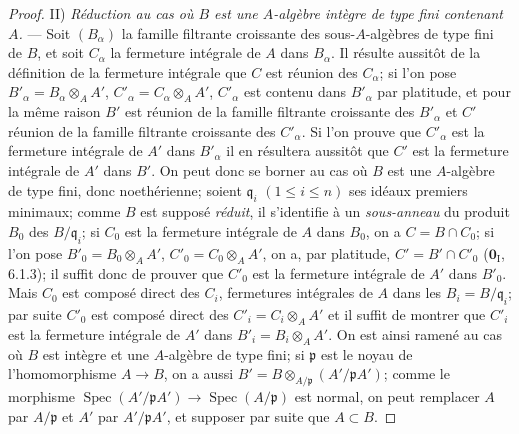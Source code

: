 \begin{proof}
II) \emph{Réduction au cas où $B$ est une $A$-algèbre intègre de type fini
contenant $A$.} --- Soit $(B_\alpha)$ la famille filtrante croissante des
sous-$A$-algèbres de type fini de $B$, et soit $C_\alpha$ la fermeture
intégrale de $A$ dans $B_\alpha$. Il résulte aussitôt de la définition de
la fermeture intégrale que $C$ est réunion des $C_\alpha$; si l'on pose
$B'_\alpha=B_\alpha\otimes_A A'$, $C'_\alpha=C_\alpha\otimes_A A'$,
$C'_\alpha$ est contenu dans $B'_\alpha$ par platitude, et pour la même
raison $B'$ est réunion de la famille filtrante croissante des
$B'_\alpha$ et $C'$ réunion de la famille filtrante croissante des
$C'_\alpha$. Si l'on prouve que $C'_\alpha$ est la fermeture intégrale de
$A'$ dans $B'_\alpha$ il en résultera aussitôt que $C'$ est la fermeture
intégrale de $A'$ dans $B'$. On peut donc se borner au cas où $B$ est une
$A$-algèbre de type fini, donc noethérienne; soient $\mathfrak q_i$
$(1\leqslant i\leqslant n)$ ses idéaux premiers minimaux; comme $B$ est
supposé \emph{réduit}, il s'identifie à un \emph{sous-anneau} du produit $B_0$ des
$B/\mathfrak q_i$; si $C_0$ est la fermeture intégrale de $A$ dans $B_0$,
on a $C=B\cap C_0$; si l'on pose $B'_0=B_0\otimes_A A'$,
$C'_0=C_0\otimes_A A'$, on a, par platitude,
$C'=B'\cap C'_0$ ($\mathbf{0}_{\mathrm I}$, 6.1.3); il suffit donc de prouver que
$C'_0$ est la fermeture intégrale de $A'$ dans $B'_0$. Mais $C_0$ est
composé direct des $C_i$, fermetures intégrales de $A$ dans les
$B_i=B/\mathfrak q_i$; par suite $C'_0$ est composé direct des
$C'_i=C_i\otimes_A A'$ et il suffit de montrer que $C'_i$ est la fermeture
intégrale de $A'$ dans $B'_i=B_i\otimes_A A'$. On est ainsi ramené au cas
où $B$ est intègre et une $A$-algèbre de type fini; si $\mathfrak p$ est le
noyau de l'homomorphisme $A\to B$, on a aussi
$B'=B\otimes_{A/\mathfrak p}(A'/\mathfrak pA')$; comme le morphisme
$\operatorname{Spec}(A'/\mathfrak pA')\to
\operatorname{Spec}(A/\mathfrak p)$ est normal, on peut remplacer $A$ par
$A/\mathfrak p$ et $A'$ par $A'/\mathfrak pA'$, et supposer par suite que
$A\subset B$.


\end{proof}
